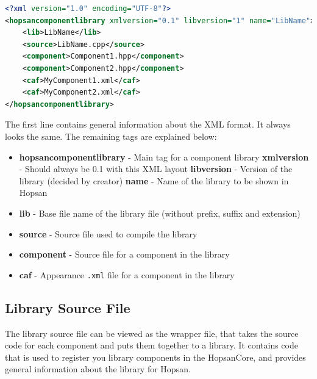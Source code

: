 \documentclass[a4paper,pdftex]{article}
\begin{document}
\begin{minipage}{\linewidth}
\begin{lstlisting}[language=xml, basicstyle=\small\ttfamily]
<?xml version="1.0" encoding="UTF-8"?>
<hopsancomponentlibrary xmlversion="0.1" libversion="1" name="LibName">
    <lib>LibName</lib>
    <source>LibName.cpp</source>
    <component>Component1.hpp</component>
    <component>Component2.hpp</component>
    <caf>MyComponent1.xml</caf>
    <caf>MyComponent2.xml</caf>
</hopsancomponentlibrary>
\end{lstlisting}
\end{minipage}

\noindent The first line contains general information about the XML format. It always looks the same. The remaining tags are explained below:

\begin{itemize}
\item \textbf{hopsancomponentlibrary} - Main tag for a component library
\subitem \textbf{xmlversion} - Should always be 0.1 with this XML layout
\subitem \textbf{libversion} - Version of the library (decided by creator)
\subitem \textbf{name} - Name of the library to be shown in Hopsan
\item \textbf{lib} - Base file name of the library file (without prefix, suffix and extension)
\item \textbf{source} - Source file used to compile the library
\item \textbf{component} - Source file for a component in the library
\item \textbf{caf} - Appearance \texttt{.xml} file for a component in the library
\end{itemize}

\subsection*{Library Source File}
The library source file can be viewed as the wrapper file, that takes the source code for each component and puts them together to a library. 
It contains code that is used to register you library components in the HopsanCore, and provides general information about the library for Hopsan.
\end{document}
